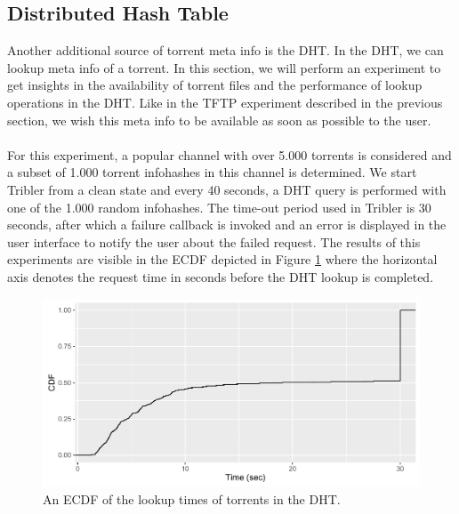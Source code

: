 \subsection{Distributed Hash Table}
\label{subsec:dht-experiment}
Another additional source of torrent meta info is the DHT. In the DHT, we can lookup meta info of a torrent. In this section, we will perform an experiment to get insights in the availability of torrent files and the performance of lookup operations in the DHT. Like in the TFTP experiment described in the previous section, we wish this meta info to be available as soon as possible to the user.\\\\
For this experiment, a popular channel with over 5.000 torrents is considered and a subset of 1.000 torrent infohashes in this channel is determined. We start Tribler from a clean state and every 40 seconds, a DHT query is performed with one of the 1.000 random infohashes. The time-out period used in Tribler is 30 seconds, after which a failure callback is invoked and an error is displayed in the user interface to notify the user about the failed request. The results of this experiments are visible in the ECDF depicted in Figure \ref{fig:metainfo_fetch} where the horizontal axis denotes the request time in seconds before the DHT lookup is completed.\\

\begin{figure}[!h]
	\centering
	\includegraphics[width=1.0\columnwidth]{images/experiments/metainfo_fetch}
	\caption{An ECDF of the lookup times of torrents in the DHT.}
	\label{fig:metainfo_fetch}
\end{figure}

